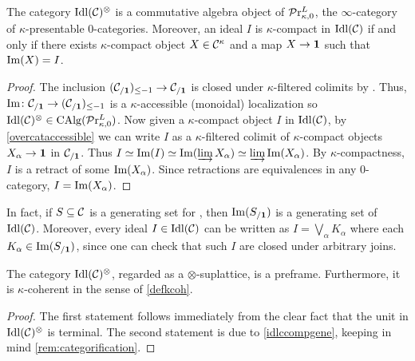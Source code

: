 \documentclass[10pt,a4paper,oneside]{article}
\begin{document}
\begin{prop}\label{idlccompgene}
The category $\operatorname{Idl}(\mathcal{C})^\otimes$ is a commutative algebra object of $\mathcal{P}\mathrm{r}^L_{\kappa,0}$, the $\infty$-category of $\kappa$-presentable $0$-categories. Moreover, an ideal $I$ is $\kappa$-compact in $\operatorname{Idl}(\mathcal{C})$ if and only if there exists $\kappa$-compact object $X\in\mathcal{C}^\kappa$ and a map $X\to \mathbf{1}$ such that $\operatorname{Im}(X)=I$.
\end{prop}

\begin{proof}
The inclusion $(\mathcal{C}_{/\mathbf{1}})_{\leq-1}\to \mathcal{C}_{/\mathbf{1}}$ is closed under $\kappa$-filtered colimits by \cite[Lemma 5.5.6.15]{htt}. Thus, $\operatorname{Im} \colon \mathcal{C}_{/\mathbf{1}}\to (\mathcal{C}_{/\mathbf{1}})_{\leq-1}$ is a $\kappa$-accessible (monoidal) localization so $\operatorname{Idl}(\mathcal{C})^{\otimes}\in\operatorname{CAlg}(\mathcal{P}\mathrm{r}^L_{\kappa,0})$. Now given a $\kappa$-compact object $I$ in $\operatorname{Idl}(\mathcal{C})$, by \cref{overcataccessible} we can write $I$ as a $\kappa$-filtered colimit of $\kappa$-compact objects $X_\alpha\to \mathbf{1}$ in $\mathcal{C}_{/\mathbf{1}}$. Thus $I \simeq \operatorname{Im}(I) \simeq \operatorname{Im}(\varinjlim X_\alpha) \simeq\varinjlim \operatorname{Im}(X_\alpha)$. By $\kappa$-compactness, $I$ is a retract of some $\operatorname{Im}(X_\alpha)$. Since retractions are equivalences in any $0$-category, $I=\operatorname{Im}(X_\alpha)$.
\end{proof}

\begin{rem}\label{rem:generatingset}
In fact, if $S\subseteq \mathcal{C}$ is a generating set for \mcc, then $\operatorname{Im}(S_{/\mathbf{1}})$ is a generating set of $\operatorname{Idl}(\mathcal{C})$. Moreover, every ideal $I\in \operatorname{Idl}(\mathcal{C})$ can be written as $I=\bigvee_\alpha K_\alpha$ where each $K_\alpha\in \operatorname{Im}(S_{/\mathbf{1}})$, since one can check that such $I$ are closed under arbitrary joins. 
\end{rem}

\begin{cor}\label{cor:idlc-preframe}
The category $\operatorname{Idl}(\mathcal{C})^\otimes$, regarded as a $\otimes$-suplattice, is a preframe. Furthermore, it is $\kappa$-coherent in the sense of \cref{defkcoh}.
\end{cor}
\begin{proof}
The first statement follows immediately from the clear fact that the unit in $\operatorname{Idl}(\mathcal{C})^\otimes$ is terminal. The second statement is due to \cref{idlccompgene}, keeping in mind \cref{rem:categorification}.
\end{proof}
\end{document}
